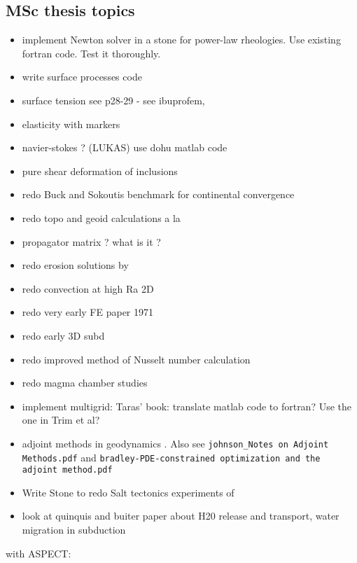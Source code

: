 \subsection{MSc thesis topics}
\begin{itemize} 
\item implement Newton solver in a stone for power-law rheologies. Use existing fortran code. Test it thoroughly.
\item write surface processes code
\item surface tension see \cite{reddybook2}p28-29 - see ibuprofem, \cite{dett04} 
\item elasticity with markers
\item navier-stokes ? (LUKAS) use dohu matlab code
\item pure shear deformation of inclusions \cite{trla00}
\item redo Buck and Sokoutis benchmark for continental convergence \cite{buso94}
\item redo topo and geoid calculations a la \cite{king09}
\item propagator matrix ? what is it ? \cite{ribe18} 
\Literature \cite{haoc78,haoc81,riha84,zhon96,como97,mohc98,zhzu00,lezh08,leha08,mofm07,mibb09,fope91,lizh13,bugo94} 
\item redo erosion solutions by \cite{cull60} 
\item redo convection at high Ra 2D \cite{scan85}
\item redo very early FE paper 1971 \cite{stbe71}
\item redo early 3D subd \cite{zhgu96}
\item redo improved method of Nusselt number calculation \cite{hohr87}
\item redo magma chamber studies \cite{cuwi14,gehn18}
\item implement multigrid: Taras' book: translate matlab code to fortran? Use the one in Trim et al?
\item adjoint methods in geodynamics \cite{bugs09,ghbu16,hobo14,isks07,ligs17,wahg15,wama09,wosp14}.
Also see {\tt johnson\_Notes on Adjoint Methods.pdf} and {\tt bradley-PDE-constrained optimization and the adjoint method.pdf} 
\item Write Stone to redo Salt tectonics experiments of \cite{dacl94}
\item look at quinquis and buiter paper about H20 release and transport, water migration in subduction
\end{itemize}

with ASPECT:

